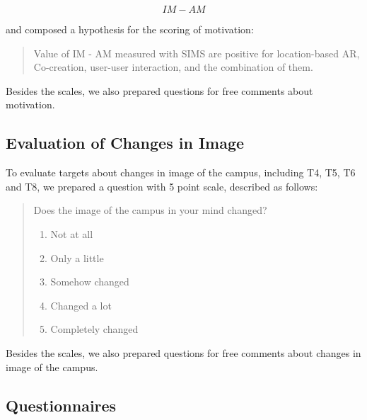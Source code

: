 \[ IM - AM \]

and composed a hypothesis for the scoring of motivation:

\begin{quote}
  Value of IM - AM measured with SIMS are positive for location-based AR, Co-creation, user-user interaction, and the combination of them.
\end{quote}


Besides the scales, we also prepared questions for free comments about motivation.

\subsection{Evaluation of Changes in Image}

To evaluate targets about changes in image of the campus, including T4, T5, T6 and T8,
we prepared a question with 5 point scale, described as follows:

\begin{quote}
  Does the image of the campus in your mind changed?
  \begin{enumerate}
    \item Not at all
    \item Only a little
    \item Somehow changed
    \item Changed a lot
    \item Completely changed
  \end{enumerate}
\end{quote}

Besides the scales, we also prepared questions for free comments about changes in image of the campus.

\subsection{Questionnaires}

